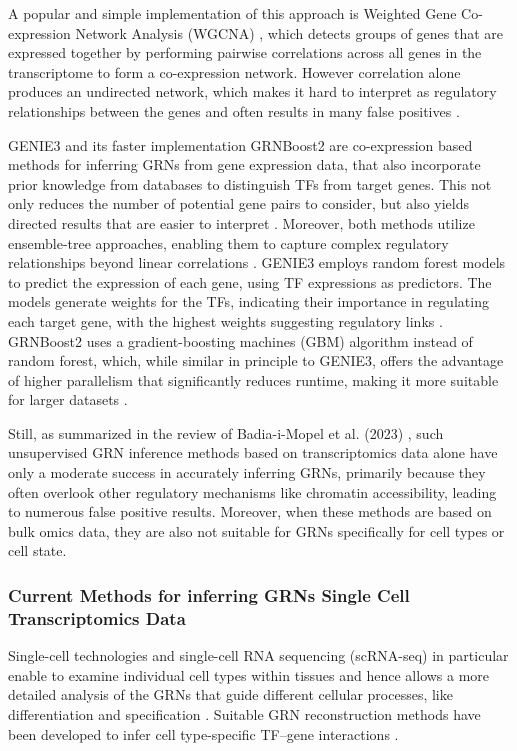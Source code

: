A popular and simple implementation of this approach is Weighted Gene Co-expression Network Analysis 
(WGCNA) \cite{langfelder2008wgcna}, which detects groups of genes that are expressed together by performing 
pairwise correlations across all genes in the transcriptome to form a co-expression network. 
However correlation alone produces an undirected network, which makes it hard to interpret as regulatory 
relationships between the genes and often results in many false positives \cite{badia2023gene}. 

GENIE3  \cite{huynh2010inferring}  and its faster implementation GRNBoost2 \cite{moerman2019grnboost2} are co-expression 
based methods  for inferring GRNs from gene expression data, that also incorporate prior knowledge from databases to 
distinguish TFs from target genes. This not only reduces the number of potential gene pairs to consider, but also yields 
directed results that are easier to interpret \cite{badia2023gene}. Moreover, both methods utilize ensemble-tree approaches, 
enabling them to capture complex regulatory relationships beyond linear correlations \cite{van2020scalable}. GENIE3 employs 
random forest models to predict the expression of each gene, using TF expressions as predictors. The models generate weights 
for the TFs, indicating their importance in regulating each target gene, with the highest weights suggesting regulatory 
links \cite{aibar2017scenic}. GRNBoost2 uses a gradient-boosting machines (GBM) algorithm instead of random forest, which, 
while similar in principle to GENIE3, offers the advantage of higher parallelism that significantly reduces runtime, 
making it more suitable for larger datasets \cite{moerman2019grnboost2}. 

Still, as summarized in the review of Badia-i-Mopel et al. (2023)  \cite{badia2023gene}, such unsupervised GRN inference 
methods based on transcriptomics data alone have only a moderate success in accurately inferring GRNs, primarily because 
they often overlook other regulatory mechanisms like chromatin accessibility, leading to numerous false positive results. 
Moreover, when these methods are based on bulk omics data, they are also not suitable for GRNs specifically for cell types 
or cell state. 

\subsubsection{Current Methods for inferring GRNs Single Cell Transcriptomics Data}
Single-cell technologies and single-cell RNA sequencing (scRNA-seq) in particular enable to examine individual cell 
types within tissues and hence allows a more detailed analysis of the GRNs that guide different cellular processes, 
like differentiation and specification \cite{nguyen2021comprehensive}. 
Suitable GRN reconstruction methods have been developed to infer cell type-specific TF–gene interactions \cite{badia2023gene}.

